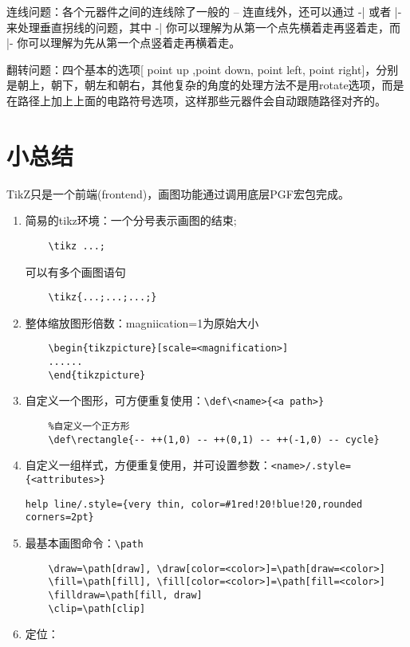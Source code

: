 连线问题：各个元器件之间的连线除了一般的 -- 连直线外，还可以通过 -| 或者 |- 来处理垂直拐线的问题，其中 -| 你可以理解为从第一个点先横着走再竖着走，而 |- 你可以理解为先从第一个点竖着走再横着走。

翻转问题：四个基本的选项[ point up ,point down, point left, point right]，分别是朝上，朝下，朝左和朝右，其他复杂的角度的处理方法不是用rotate选项，而是在路径上加上上面的电路符号选项，这样那些元器件会自动跟随路径对齐的。
\section{小总结}
TikZ只是一个前端(frontend)，画图功能通过调用底层PGF宏包完成。
\begin{enumerate}
	\item 简易的tikz环境：一个分号表示画图的结束;
	\begin{lstlisting}
	\tikz ...;
	\end{lstlisting}
	可以有多个画图语句
	\begin{lstlisting}
	\tikz{...;...;...;}
	\end{lstlisting}
	\item 整体缩放图形倍数：magniication=1为原始大小
	\begin{lstlisting}
	\begin{tikzpicture}[scale=<magnification>]
	......
	\end{tikzpicture}
	\end{lstlisting}
	\item 自定义一个图形，可方便重复使用：\lstinline|\def\<name>{<a path>}|
	\begin{lstlisting}
	%自定义一个正方形 
	\def\rectangle{-- ++(1,0) -- ++(0,1) -- ++(-1,0) -- cycle}
	\end{lstlisting}
	\item 自定义一组样式，方便重复使用，并可设置参数：\lstinline|<name>/.style={<attributes>}|
	\begin{lstlisting}
help line/.style={very thin, color=#1red!20!blue!20,rounded corners=2pt}
	\end{lstlisting}
	\item 最基本画图命令：\lstinline|\path|
	\begin{lstlisting}
	\draw=\path[draw], \draw[color=<color>]=\path[draw=<color>]
	\fill=\path[fill], \fill[color=<color>]=\path[fill=<color>]
	\filldraw=\path[fill, draw]
	\clip=\path[clip]
	\end{lstlisting}
	\item 定位：
	\begin{lstlisting}

\end{lstlisting}
\end{enumerate}
